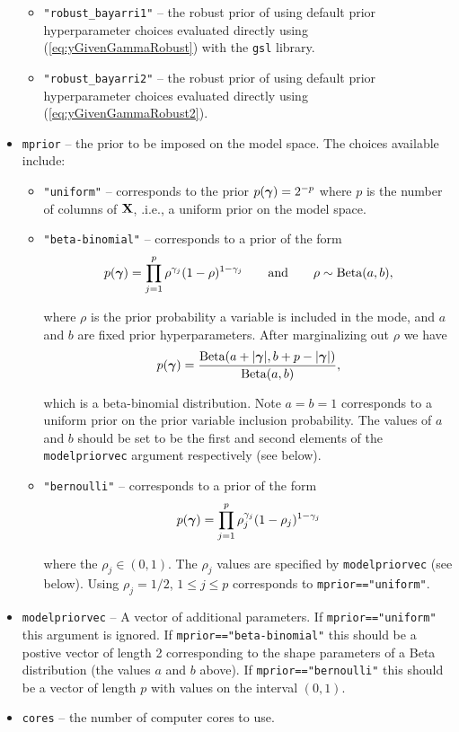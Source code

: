 \begin{itemize}
\begin{itemize}
		\item {\tt "robust\_bayarri1"} -- the robust prior of \cite{Bayarri2012}
		using default prior hyperparameter choices evaluated directly using 
		(\ref{eq:yGivenGammaRobust}) with the {\tt gsl} library.
		
		\item {\tt "robust\_bayarri2"} -- the robust prior of \cite{Bayarri2012}
		using default prior hyperparameter choices evaluated directly using
		(\ref{eq:yGivenGammaRobust2}).
		
	\end{itemize}
	\item {\tt mprior} -- the prior to be imposed on the model space. The choices available include:
	\begin{itemize}
		\item {\tt "uniform"} -- corresponds to the prior $p({\boldsymbol \gamma}) = 2^{-p}$ where $p$ is the number of columns of ${\bf X}$, .i.e.,
		a uniform prior on the model space.
		
		\item {\tt "beta-binomial"} -- corresponds to a prior of the form
		$$
		\displaystyle p({\boldsymbol \gamma}) = \prod_{j=1}^p \rho^{\gamma_j} (1 - \rho)^{1 - \gamma_j} \qquad \mbox{and} \qquad \rho \sim \mbox{Beta}(a,b),
		$$
		
		\noindent where $\rho$ is the prior probability a variable is included in the mode, and $a$ and $b$ are fixed prior hyperparameters. After marginalizing out $\rho$ we have
		$$
		p({\boldsymbol \gamma}) = \frac{\mbox{Beta}(a + |{\boldsymbol \gamma}|,b + p - |{\boldsymbol \gamma}|)}{\mbox{Beta}(a,b)},
		$$
		
		\noindent which is a beta-binomial distribution. Note $a=b=1$ corresponds to a uniform prior on the prior
		variable inclusion probability. The values of $a$ and $b$ should be set to be the
		first and second elements of the {\tt modelpriorvec} argument respectively (see below).
		
		\item {\tt "bernoulli"} -- corresponds to a prior of the form 
		$$
		p({\boldsymbol \gamma}) = \prod_{j=1}^p \rho_j^{\gamma_j} (1 - \rho_j)^{1 - \gamma_j}
		$$
		
		\noindent where the $\rho_j\in(0,1)$. The $\rho_j$ values are specified by
		{\tt modelpriorvec} (see below). Using $\rho_j = 1/2$, $1\le j\le p$ corresponds to 
		{\tt mprior=="uniform"}.
	\end{itemize}
	
	\item {\tt modelpriorvec} -- A vector of additional parameters. If {\tt mprior=="uniform"} this argument is ignored.
	If {\tt mprior=="beta-binomial"} this should be a postive vector of length 2 corresponding to the shape parameters
	of a Beta distribution (the values $a$ and $b$ above). If {\tt mprior=="bernoulli"} this should be a vector of length $p$ 
	with values on the interval $(0,1)$.
	
	\item {\tt cores} -- the number of computer cores to use.
\end{itemize}


